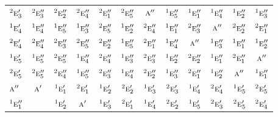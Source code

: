 \documentclass[10pt,a4paper]{article}
\numberwithin{equation}{section}
\newcommand{\irr}[1]{\text{\normalfont\scshape #1}}
\newcommand{\conjpair}[1]{{}^{#1}}
\begin{document}
{\begin{longtable}{@{}lccccccccccc@{}}
$\conjpair{2}\irr{e}_{3}'$ & $\conjpair{2}\irr{e}_{3}''$ & $\conjpair{2}\irr{e}_{2}''$ & $\conjpair{2}\irr{e}_{4}''$ & $\conjpair{2}\irr{e}_{1}''$ & $\conjpair{2}\irr{e}_{5}''$ & $\irr{a}''$ & $\conjpair{1}\irr{e}_{5}''$ & $\conjpair{1}\irr{e}_{1}''$ & $\conjpair{1}\irr{e}_{4}''$ & $\conjpair{1}\irr{e}_{2}''$ & $\conjpair{1}\irr{e}_{3}''$\\
$\conjpair{1}\irr{e}_{4}'$ & $\conjpair{1}\irr{e}_{4}''$ & $\conjpair{1}\irr{e}_{5}''$ & $\conjpair{1}\irr{e}_{3}''$ & $\conjpair{2}\irr{e}_{5}''$ & $\conjpair{1}\irr{e}_{2}''$ & $\conjpair{2}\irr{e}_{4}''$ & $\conjpair{1}\irr{e}_{1}''$ & $\conjpair{2}\irr{e}_{3}''$ & $\irr{a}''$ & $\conjpair{2}\irr{e}_{2}''$ & $\conjpair{2}\irr{e}_{1}''$\\
$\conjpair{2}\irr{e}_{4}'$ & $\conjpair{2}\irr{e}_{4}''$ & $\conjpair{2}\irr{e}_{3}''$ & $\conjpair{2}\irr{e}_{5}''$ & $\conjpair{2}\irr{e}_{2}''$ & $\conjpair{1}\irr{e}_{5}''$ & $\conjpair{2}\irr{e}_{1}''$ & $\conjpair{1}\irr{e}_{4}''$ & $\irr{a}''$ & $\conjpair{1}\irr{e}_{3}''$ & $\conjpair{1}\irr{e}_{1}''$ & $\conjpair{1}\irr{e}_{2}''$\\
$\conjpair{1}\irr{e}_{5}'$ & $\conjpair{1}\irr{e}_{5}''$ & $\conjpair{2}\irr{e}_{5}''$ & $\conjpair{1}\irr{e}_{4}''$ & $\conjpair{2}\irr{e}_{4}''$ & $\conjpair{1}\irr{e}_{3}''$ & $\conjpair{2}\irr{e}_{3}''$ & $\conjpair{1}\irr{e}_{2}''$ & $\conjpair{2}\irr{e}_{2}''$ & $\conjpair{1}\irr{e}_{1}''$ & $\conjpair{2}\irr{e}_{1}''$ & $\irr{a}''$\\
$\conjpair{2}\irr{e}_{5}'$ & $\conjpair{2}\irr{e}_{5}''$ & $\conjpair{2}\irr{e}_{4}''$ & $\conjpair{1}\irr{e}_{5}''$ & $\conjpair{2}\irr{e}_{3}''$ & $\conjpair{1}\irr{e}_{4}''$ & $\conjpair{2}\irr{e}_{2}''$ & $\conjpair{1}\irr{e}_{3}''$ & $\conjpair{2}\irr{e}_{1}''$ & $\conjpair{1}\irr{e}_{2}''$ & $\irr{a}''$ & $\conjpair{1}\irr{e}_{1}''$\\
$\irr{a}''$ & $\irr{a}'$ & $\conjpair{1}\irr{e}_{1}'$ & $\conjpair{2}\irr{e}_{1}'$ & $\conjpair{1}\irr{e}_{2}'$ & $\conjpair{2}\irr{e}_{2}'$ & $\conjpair{1}\irr{e}_{3}'$ & $\conjpair{2}\irr{e}_{3}'$ & $\conjpair{1}\irr{e}_{4}'$ & $\conjpair{2}\irr{e}_{4}'$ & $\conjpair{1}\irr{e}_{5}'$ & $\conjpair{2}\irr{e}_{5}'$\\
$\conjpair{1}\irr{e}_{1}''$ &  & $\conjpair{1}\irr{e}_{2}'$ & $\irr{a}'$ & $\conjpair{1}\irr{e}_{3}'$ & $\conjpair{2}\irr{e}_{1}'$ & $\conjpair{1}\irr{e}_{4}'$ & $\conjpair{2}\irr{e}_{2}'$ & $\conjpair{1}\irr{e}_{5}'$ & $\conjpair{2}\irr{e}_{3}'$ & $\conjpair{2}\irr{e}_{5}'$ & $\conjpair{2}\irr{e}_{4}'$\\

\end{longtable}}
\end{document}
